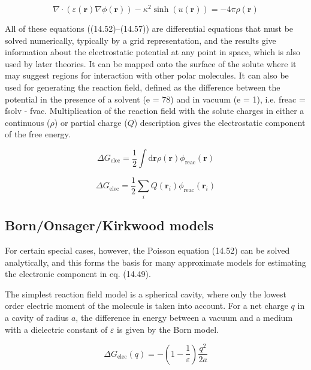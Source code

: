 \[
\nabla\cdot(\varepsilon(\mathbf{r})\nabla\phi(\mathbf{r}))-\kappa^{2}\sinh\left(u(\mathbf{r})\right)=-4\pi\rho(\mathbf{r})
\]


All of these equations ((14.52)–(14.57)) are differential equations
that must be solved numerically, typically by a grid representation,
and the results give information about the electrostatic potential
at any point in space, which is also used by later theories. It can
be mapped onto the surface of the solute where it may suggest regions
for interaction with other polar molecules. It can also be used for
generating the reaction field, defined as the difference between the
potential in the presence of a solvent (e = 78) and in vacuum (e =
1), i.e. freac = fsolv - fvac. Multiplication of the reaction field
with the solute charges in either a continuous ($\rho$) or partial
charge ($Q$) description gives the electrostatic component of the
free energy.

\begin{equation}
\Delta G_{\mathrm{elec}}=\frac{1}{2}\int\mathrm{d}\mathbf{r}\rho(\mathbf{r})\phi_{\mathrm{reac}}(\mathbf{r})
\end{equation}


\begin{equation}
\Delta G_{\mathrm{elec}}=\frac{1}{2}\sum_{i}Q(\mathbf{r}_{i})\phi_{\mathrm{reac}}(\mathbf{r}_{i})
\end{equation}



\subsection{Born/Onsager/Kirkwood models }

For certain special cases, however, the Poisson equation (14.52) can
be solved analytically, and this forms the basis for many approximate
models for estimating the electronic component in eq. (14.49).

The simplest reaction field model is a spherical cavity, where only
the lowest order electric moment of the molecule is taken into account.
For a net charge $q$ in a cavity of radius $a$, the difference in
energy between a vacuum and a medium with a dielectric constant of
$\varepsilon$ is given by the Born model.

\begin{equation}
\Delta G_{\mathrm{elec}}(q)=-\left(1-\frac{1}{\varepsilon}\right)\frac{q^{2}}{2a}
\end{equation}


